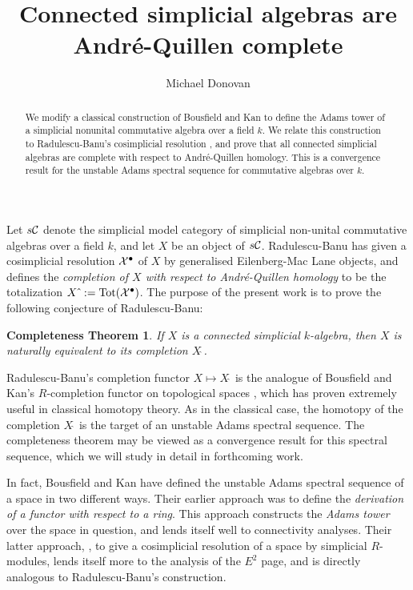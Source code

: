 \documentclass[11pt]{amsart}
\title{Connected simplicial algebras are Andr\'e-Quillen complete}
\author{Michael Donovan}
\theoremstyle{plain}
\newtheorem*{completenesstheorem}{Completeness Theorem}
\begin{document}
\maketitle

\begin{abstract}
We modify a classical construction of Bousfield and Kan \cite{BousKanSSeq.pdf} to define the Adams tower of a simplicial nonunital commutative algebra over a field $k$. We relate this construction to Radulescu-Banu's cosimplicial resolution \cite{Radulescu-Banu.pdf}, and prove that all connected simplicial algebras are complete with respect to Andr\'e-Quillen homology. This is a convergence result for the unstable Adams spectral sequence for commutative algebras over $k$.
\end{abstract}

Let $s\mathcal{C}$ denote the simplicial model category \cite{QuillenHomAlg.pdf} of simplicial non-unital commutative algebras over a field $k$, and let $X$ be an object of $s\mathcal{C}$. Radulescu-Banu \cite{Radulescu-Banu.pdf} has given a cosimplicial resolution $\mathcal{X}^\bullet$ of $X$ by generalised Eilenberg-Mac Lane objects, and defines the \emph{completion of $X$ with respect to Andr\'e-Quillen homology} to be the totalization $X\hat{\ }:=\textup{Tot}(\mathcal{X}^\bullet)$. The purpose of the present work is to prove the following conjecture of Radulescu-Banu:
\begin{completenesstheorem}\label{completenesstheorem}
If $X$ is a connected simplicial $k$-algebra, then $X$ is naturally equivalent to its completion $X\hat{\ }$.
\end{completenesstheorem}
Radulescu-Banu's completion functor $X\mapsto X\hat{\ }$ is the analogue of Bousfield and Kan's $R$-completion functor on topological spaces \cite{BousKanSSeq.pdf}, which has proven extremely useful in classical homotopy theory. As in the classical case, the homotopy of the completion $X\hat{\ }$ is the target of an unstable Adams spectral sequence. The completeness theorem may be viewed as a convergence result for this spectral sequence, which we will study in detail in forthcoming work.

In fact, Bousfield and Kan have defined the unstable Adams spectral sequence of a space in two different ways. Their earlier approach \cite{BK_pairings.pdf} was to define the \emph{derivation of a functor with respect to a ring}. This approach constructs the \emph{Adams tower} over the space in question, and lends itself well to connectivity analyses. Their latter approach, \cite{BousKanSSeq.pdf}, to give a cosimplicial resolution of a space by simplicial $R$-modules, lends itself more to the analysis of the $E^2$ page, and is directly analogous to Radulescu-Banu's construction.
\end{document}

